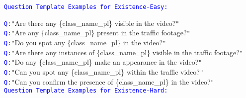 \begin{figure*}[htbp]
\centering
\begin{tcolorbox}[colback=gray!10,%
	colframe=black,%
	width=\textwidth,
	arc=1mm, auto outer arc,
	boxrule=0.5pt,
	]

 	\texttt{\textcolor{blue}{Question Template Examples for Existence-Easy:}}
  
        \texttt{\textcolor{blue}{Q:}}\texttt{"}Are there any \mbox{\{class\_name\_pl\}} visible in the video?\texttt{"}\\
        \texttt{\textcolor{blue}{Q:}}\texttt{"}Are any \mbox{\{class\_name\_pl\}} present in the traffic footage?\texttt{"}\\
        \texttt{\textcolor{blue}{Q:}}\texttt{"}Do you spot any \mbox{\{class\_name\_pl\}} in the video?\texttt{"}\\
        \texttt{\textcolor{blue}{Q:}}\texttt{"}Are there any instances of \mbox{\{class\_name\_pl\}} visible in the traffic footage?\texttt{"}\\
        \texttt{\textcolor{blue}{Q:}}\texttt{"}Do any \mbox{\{class\_name\_pl\}} make an appearance in the video?\texttt{"}\\
        \texttt{\textcolor{blue}{Q:}}\texttt{"}Can you spot any \mbox{\{class\_name\_pl\}} within the traffic video?\texttt{"}\\
        \texttt{\textcolor{blue}{Q:}}\texttt{"}Can you confirm the presence of \mbox{\{class\_name\_pl\}} in the video?\texttt{"}\\

  	\texttt{\textcolor{blue}{Question Template Examples for Existence-Hard:}}
   

\end{tcolorbox}
\end{figure*}
